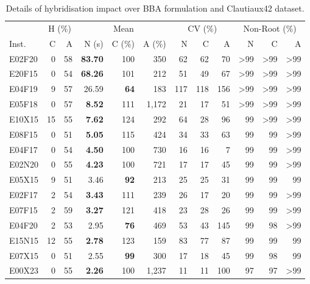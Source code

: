 \documentclass[ppgc,tese,english,formais,babel]{iiufrgs}
\newcommand{\bestcolumnemph}[1]{\textbf{#1}}
\begin{document}
\begin{table}
\caption{Details of hybridisation impact over BBA formulation and Clautiaux42 dataset.}
\label{tab:g2opp_multiple_seeds_full_CV_hyb}
\begin{center}
\begin{tabular}{lrrrrrrrrrrr}
\hline\hline
& \multicolumn{2}{c}{H (\%)} & \multicolumn{3}{c}{Mean} & \multicolumn{3}{c}{CV (\%)} & \multicolumn{3}{c}{Non-Root (\%)} \\\cmidrule(lr){2-3}\cmidrule(lr){4-6}\cmidrule(lr){7-9}\cmidrule(lr){10-12}
Inst. & C & A & N (s) & C (\%) & A (\%) & N & C & A & N & C & A \\\hline\hline
E02F20 & 0 & 58 & \bestcolumnemph{83.70} & 100 & 350 & 62 & 62 & 70 & >99 & >99 & >99 \\
E20F15 & 0 & 54 & \bestcolumnemph{68.26} & 101 & 212 & 51 & 49 & 67 & >99 & >99 & >99 \\
E04F19 & 9 & 57 & 26.59 & \bestcolumnemph{64} & 183 & 117 & 118 & 156 & >99 & >99 & >99 \\
E05F18 & 0 & 57 & \bestcolumnemph{8.52} & 111 & 1,172 & 21 & 17 & 51 & >99 & >99 & >99 \\
E10X15 & 15 & 55 & \bestcolumnemph{7.62} & 124 & 292 & 64 & 28 & 96 & 99 & >99 & >99 \\
E08F15 & 0 & 51 & \bestcolumnemph{5.05} & 115 & 424 & 34 & 33 & 63 & 99 & 99 & >99 \\
E04F17 & 0 & 54 & \bestcolumnemph{4.50} & 100 & 730 & 16 & 16 & 7 & 99 & 99 & >99 \\
E02N20 & 0 & 55 & \bestcolumnemph{4.23} & 100 & 721 & 17 & 17 & 45 & 99 & 99 & >99 \\
E05X15 & 9 & 51 & 3.46 & \bestcolumnemph{92} & 213 & 25 & 25 & 31 & 99 & 99 & 99 \\
E02F17 & 2 & 54 & \bestcolumnemph{3.43} & 111 & 239 & 26 & 17 & 20 & 99 & 99 & >99 \\
E07F15 & 2 & 59 & \bestcolumnemph{3.27} & 121 & 418 & 23 & 28 & 26 & 99 & 99 & >99 \\
E04F20 & 2 & 53 & 2.95 & \bestcolumnemph{76} & 469 & 53 & 43 & 145 & 99 & 98 & >99 \\
E15N15 & 12 & 55 & \bestcolumnemph{2.78} & 123 & 159 & 83 & 77 & 87 & 99 & 99 & 99 \\
E07X15 & 0 & 51 & 2.55 & \bestcolumnemph{99} & 300 & 17 & 18 & 45 & 99 & 98 & 99 \\
E00X23 & 0 & 55 & \bestcolumnemph{2.26} & 100 & 1,237 & 11 & 11 & 100 & 97 & 97 & >99 \\

\end{tabular}
\end{center}
\end{table}
\end{document}
